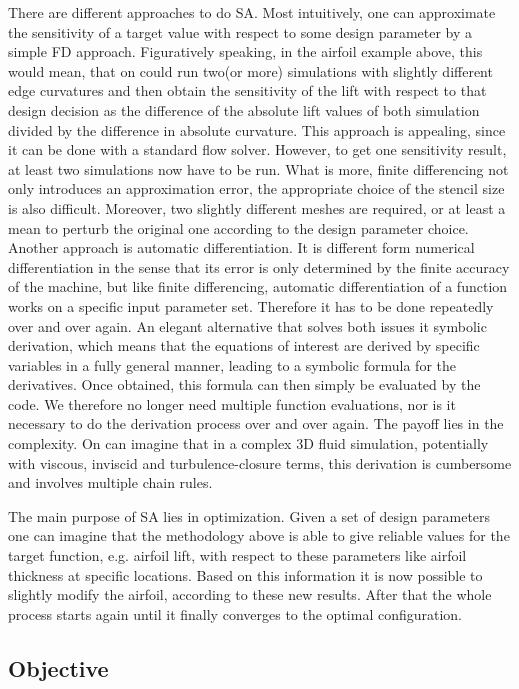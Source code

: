 There are different approaches to do \ac{SA}. Most intuitively, one can approximate the sensitivity of a target value with respect to some design parameter by a simple \ac{FD} approach. Figuratively speaking, in the airfoil example above, this would mean, that on could run two(or more) simulations with slightly different edge curvatures and then obtain the sensitivity of the lift with respect to that design decision as the difference of the absolute lift values of both simulation divided by the difference in absolute curvature. This approach is appealing, since it can be done with a standard flow solver. However, to get one sensitivity result, at least two simulations now have to be run. What is more, finite differencing not only introduces an approximation error, the appropriate choice of the stencil size is also difficult. Moreover, two slightly different meshes are required, or at least a mean to perturb the original one according to the design parameter choice.\\
Another approach is automatic differentiation. It is different form numerical differentiation in the sense that its error is only determined by the finite accuracy of the machine, but like finite differencing, automatic differentiation of a function works on a specific input parameter set. Therefore it has to be done repeatedly over and over again.
An elegant alternative that solves both issues it symbolic derivation, which means that the equations of interest are derived by specific variables in a fully general manner, leading to a symbolic formula for the derivatives. Once obtained, this formula can then simply be evaluated by the code. We therefore no longer need multiple function evaluations, nor is it necessary to do the derivation process over and over again. The payoff lies in the complexity. On can imagine that in a complex 3D fluid simulation, potentially with viscous, inviscid and turbulence-closure terms, this derivation is cumbersome and involves multiple chain rules.

The main purpose of \ac{SA} lies in optimization. Given a set of design parameters one can imagine that the methodology above is able to give reliable values for the target function, e.g. airfoil lift, with respect to these parameters like airfoil thickness at specific locations. Based on this information it is now possible to slightly modify the airfoil, according to these new results. After that the whole process starts again until it finally converges to the optimal configuration.
\subsection{Objective}\label{sec:objective}

